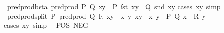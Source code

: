 \begin{isabellebody}
\isamarkupfalse%
\ pred{\isacharunderscore}{\kern0pt}prod{\isacharunderscore}{\kern0pt}beta{\isacharcolon}{\kern0pt}\ {\isachardoublequoteopen}pred{\isacharunderscore}{\kern0pt}prod\ P\ Q\ xy\ {\isasymlongleftrightarrow}\ P\ {\isacharparenleft}{\kern0pt}fst\ xy{\isacharparenright}{\kern0pt}\ {\isasymand}\ Q\ {\isacharparenleft}{\kern0pt}snd\ xy{\isacharparenright}{\kern0pt}{\isachardoublequoteclose}\isanewline
%
\isadelimproof
%
\endisadelimproof
%
\isatagproof
{}\isamarkupfalse%
{\isacharparenleft}{\kern0pt}cases\ xy{\isacharparenright}{\kern0pt}\ simp%
\endisatagproof
{\isafoldproof}%
%
\isadelimproof
\isanewline
%
\endisadelimproof
\isanewline
{}\isamarkupfalse%
\ pred{\isacharunderscore}{\kern0pt}prod{\isacharunderscore}{\kern0pt}split{\isacharcolon}{\kern0pt}\ {\isachardoublequoteopen}P\ {\isacharparenleft}{\kern0pt}pred{\isacharunderscore}{\kern0pt}prod\ Q\ R\ xy{\isacharparenright}{\kern0pt}\ {\isasymlongleftrightarrow}\ {\isacharparenleft}{\kern0pt}{\isasymforall}x\ y{\isachardot}{\kern0pt}\ xy\ {\isacharequal}{\kern0pt}\ {\isacharparenleft}{\kern0pt}x{\isacharcomma}{\kern0pt}\ y{\isacharparenright}{\kern0pt}\ {\isasymlongrightarrow}\ P\ {\isacharparenleft}{\kern0pt}Q\ x\ {\isasymand}\ R\ y{\isacharparenright}{\kern0pt}{\isacharparenright}{\kern0pt}{\isachardoublequoteclose}\isanewline
%
\isadelimproof
%
\endisadelimproof
%
\isatagproof
{}\isamarkupfalse%
{\isacharparenleft}{\kern0pt}cases\ xy{\isacharparenright}{\kern0pt}\ simp%
\endisatagproof
{\isafoldproof}%
%
\isadelimproof
\isanewline
%
\endisadelimproof
\isanewline
{}\isamarkupfalse%
\ {\isacharparenleft}{\kern0pt}\ POS\ NEG\isanewline
%
\isadelimtheory
\isanewline
%
\endisadelimtheory
%
\isatagtheory
{}\isamarkupfalse%
%
\endisatagtheory
{\isafoldtheory}%
%
\isadelimtheory
%
\endisadelimtheory
%
\end{isabellebody}%
\endinput
